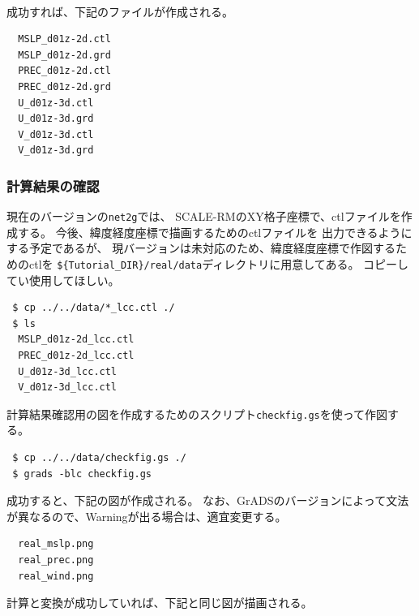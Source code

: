 \\

成功すれば、下記のファイルが作成される。
\begin{verbatim}
  MSLP_d01z-2d.ctl
  MSLP_d01z-2d.grd
  PREC_d01z-2d.ctl
  PREC_d01z-2d.grd
  U_d01z-3d.ctl
  U_d01z-3d.grd
  V_d01z-3d.ctl
  V_d01z-3d.grd
\end{verbatim}


\subsubsection{計算結果の確認}
現在のバージョンの\verb|net2g|では、
SCALE-RMのXY格子座標で、ctlファイルを作成する。
今後、緯度経度座標で描画するためのctlファイルを
出力できるようにする予定であるが、
現バージョンは未対応のため、緯度経度座標で作図するためのctlを
\verb|${Tutorial_DIR}/real/data|ディレクトリに用意してある。
コピーしてい使用してほしい。
\begin{verbatim}
 $ cp ../../data/*_lcc.ctl ./
 $ ls
  MSLP_d01z-2d_lcc.ctl
  PREC_d01z-2d_lcc.ctl
  U_d01z-3d_lcc.ctl
  V_d01z-3d_lcc.ctl
\end{verbatim}

計算結果確認用の図を作成するためのスクリプト\verb|checkfig.gs|を使って作図する。
\begin{verbatim}
 $ cp ../../data/checkfig.gs ./
 $ grads -blc checkfig.gs
\end{verbatim}
成功すると、下記の図が作成される。
なお、GrADSのバージョンによって文法が異なるので、Warningが出る場合は、適宜変更する。
\begin{verbatim}
  real_mslp.png
  real_prec.png
  real_wind.png
\end{verbatim}
計算と変換が成功していれば、下記と同じ図が描画される。

